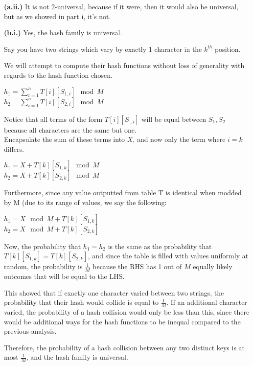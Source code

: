 \documentclass[11pt]{article}
\renewcommand{\part}[1] {\vspace{.10in} {\bf (#1)}}
\begin{document}
\part{a.ii.}
It is not 2-universal, because if it were, then it would also be universal, but as we showed in part i, it's not. 

\part{b.i.}
Yes, the hash family is universal.

Say you have two strings which vary by exactly 1 character in the $k^{th}$ position.

We will attempt to compute their hash functions without loss of generality with regards to the hash function chosen.

$h_1 = \sum_{i=1}^{n} T[i][S_{1,i}] \mod M$\\
$h_2 = \sum_{i=1}^{n} T[i][S_{2,i}] \mod M$

Notice that all terms of the form $T[i][S_{\_,i}]$ will be equal between $S_1, S_2$ because all characters are the same but one.\\
Encapsulate the sum of these terms into $X$, and now only the term where $i=k$ differs.

$h_1 = X + T[k][S_{1,k}] \mod M$\\
$h_2 = X + T[k][S_{2,k}] \mod M$

Furthermore, since any value outputted from table T is identical when modded by M (due to its range of values, we say the following:

$h_1 = X \mod M + T[k][S_{1,k}] $\\
$h_2 = X \mod M + T[k][S_{2,k}] $

Now, the probability that $h_1 = h_2$ is the same as the probability that $T[k][S_{1,k}] = T[k][S_{2,k}]$, and since the table
is filled with values uniformly at random, the probability is $\frac{1}{M}$ because the RHS has 1 out of $M$ equally likely outcomes
that will be equal to the LHS.

This showed that if exactly one character varied between two strings, the probability that their hash would collide is equal to $\frac{1}{M}$.
If an additional character varied, the probability of a hash collision would only be less than this, since there would be additional ways for the hash functions to be inequal compared to the previous analysis.

Therefore, the probability of a hash collision between any two distinct keys is at most $\frac{1}{M}$, and the hash family is universal.
\end{document}
